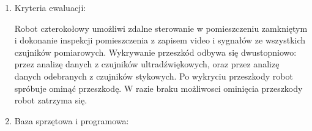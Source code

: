 \documentclass[a4paper]{article}
\begin{document}
\begin{enumerate}
\item Kryteria ewaluacji:

Robot czterokołowy umożliwi zdalne sterowanie w pomieszczeniu zamkniętym i dokonanie inspekcji pomieszczenia z zapisem video i sygnałów ze wszystkich czujników pomiarowych. Wykrywanie przeszkód odbywa się dwustopniowo: przez analizę danych z czujników ultradźwiękowych, oraz przez analizę danych odebranych z czujników stykowych. Po wykryciu przeszkody robot spróbuje ominąć przeszkodę. W razie braku możliwosci ominięcia przeszkody robot zatrzyma się.

\item Baza sprzętowa i programowa:

\end{enumerate}
\end{document}
